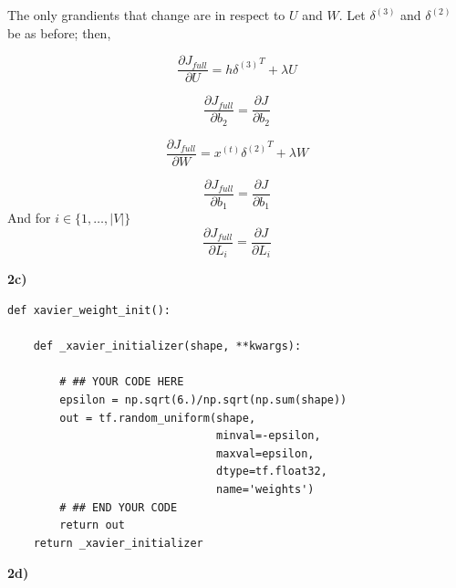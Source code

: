 \documentclass{article}
\begin{document}
The only grandients that change are in respect to $U$ and $W$. Let $\delta^{(3)}$ and $\delta^{(2)}$ be as before; then,

\begin{equation}\label{eq:18}
\frac{\partial J_{full}}{\partial  U} = {h \delta^{(3)}}^{T} + \lambda U 
\end{equation}

\begin{equation}\label{eq:19}
\frac{\partial J_{full}}{\partial  b_{2}} =  \frac{\partial J}{\partial  b_{2}}
\end{equation}

\begin{equation}\label{eq:21}
\frac{\partial J_{full}}{\partial  W} = {x^{(t)} \delta^{(2)}}^{T} + \lambda W 
\end{equation}

\begin{equation}\label{eq:22}
\frac{\partial J_{full}}{\partial  b_{1}} =  \frac{\partial J}{\partial  b_{1}} 
\end{equation}
And for $i \in \{1, \dots, |V|\}$
\begin{equation}\label{eq:23}
\frac{\partial J_{full}}{\partial  L_{i}} =  \frac{\partial J}{\partial  L_{i}} 
\end{equation}

\textbf{2c)}
\begin{verbatim}
def xavier_weight_init():
    
    def _xavier_initializer(shape, **kwargs):
        
        # ## YOUR CODE HERE
        epsilon = np.sqrt(6.)/np.sqrt(np.sum(shape))
        out = tf.random_uniform(shape,
                                minval=-epsilon,
                                maxval=epsilon,
                                dtype=tf.float32,
                                name='weights')
        # ## END YOUR CODE
        return out
    return _xavier_initializer

\end{verbatim}

\textbf{2d)}
\end{document}
